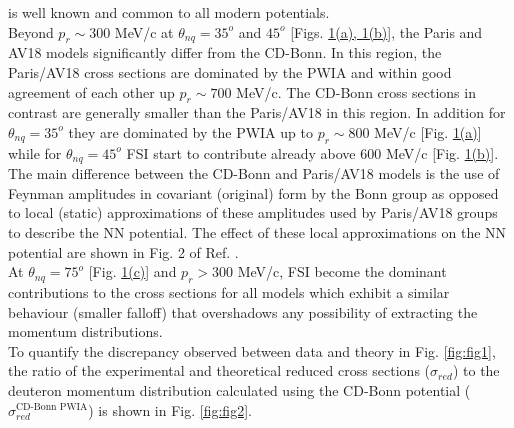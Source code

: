 is well known and common to all modern potentials. \\
\indent Beyond $p_{r}\sim$300 MeV/c at $\theta_{nq}=35^{o}$ and $45^{o}$ [Figs. \hyperref[fig:fig1]{1(a), 1(b)}], the Paris and
AV18 models significantly differ from the CD-Bonn. In this region, the Paris/AV18 cross sections are dominated by the PWIA and within good agreement of each other up $p_{r}\sim700$ MeV/c. The CD-Bonn cross sections in contrast are generally smaller than the Paris/AV18 in this region.  In addition for $\theta_{nq}=35^{o}$ they are dominated by the PWIA up to $p_{r}\sim800$ MeV/c [Fig. \hyperref[fig:fig1]{1(a)}]  while for $\theta_{nq}=45^{o}$  FSI start to contribute already above 600 MeV/c [Fig. \hyperref[fig:fig1]{1(b)}].
The main difference between the CD-Bonn and Paris/AV18 models is the use of Feynman amplitudes in covariant (original) form by the Bonn group as opposed to local (static) approximations of these amplitudes used by Paris/AV18 groups
to describe the NN potential. The effect of these local approximations on the NN potential are shown in Fig. 2 of Ref. \cite{PhysRevC.63.024001}. \\
\indent At $\theta_{nq}=75^{o}$ [Fig. \hyperref[fig:fig1]{1(c)}] and $p_{r}>300$ MeV/c, FSI become the dominant contributions to the cross sections for all models which exhibit a similar
behaviour (smaller falloff) that overshadows any possibility of extracting the momentum distributions.\\
\indent To quantify the discrepancy observed between data and theory in Fig. \ref{fig:fig1}, the ratio of the experimental and theoretical reduced cross sections ($\sigma_{red}$) to the
deuteron momentum distribution  calculated using the CD-Bonn potential ($\sigma^{\text{CD-Bonn PWIA}}_{red}$)\cite{PhysRevC.63.024001} is shown in Fig. \ref{fig:fig2}.
